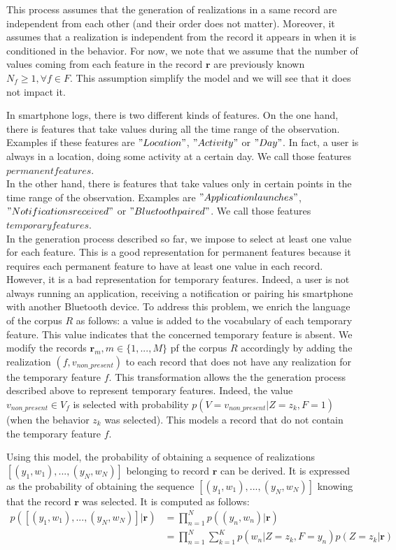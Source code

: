 This process assumes that the generation of realizations in a same record are independent from each other (and their order does not matter). Moreover, it assumes that a realization is independent from the record it appears in when it is conditioned in the behavior. For now, we note that we assume that the number of values coming from each feature in the record $\mathbf{r}$ are previously known $N_{f}\geq 1,\forall f\in F$. This assumption simplify the model and we will see that it does not impact it. \par

In smartphone logs, there is two different kinds of features. On the one hand, there is features that take values during all the time range of the observation. Examples if these features are $"Location"$, $"Activity"$ or $"Day"$. In fact, a user is always in a location, doing some activity at a certain day. We call those features $permanent features$.
\\In the other hand, there is features that take values only in certain points in the time range of the observation. Examples are $"Application launches"$, $"Notifications received"$ or $"Bluetooth paired"$. We call those features $temporary features$.
\\In the generation process described so far, we impose to select at least one value for each feature. This is a good representation for permanent features because it requires each permanent feature to have at least one value in each record. However, it is a bad representation for temporary features. Indeed, a user is not always running an application, receiving a notification or pairing his smartphone with another Bluetooth device. To address this problem, we enrich the language of the corpus $R$ as follows: a value is added to the vocabulary of each temporary feature. This value indicates that the concerned temporary feature is absent. We modify the records $\mathbf{r}_{m}, m\in\{1,...,M\}$ pf the corpus $R$ accordingly by adding the realization $(f, v_{non\_present})$ to each record that does not have any realization for the temporary feature $f$. This transformation allows the the generation process described above to represent temporary features. Indeed, the value $v_{non\_present} \in V_{f}$ is selected with probability $p(V=v_{non\_present}|Z=z_{k},F=1)$ (when the behavior $z_{k}$ was selected). This models a record that do not contain the temporary feature $f$. \par

Using this model, the probability of obtaining a sequence of realizations $[(y_{1},w_{1}),...,(y_{N},w_{N})]$ belonging to record $\mathbf{r}$ can be derived. It is expressed as the probability of obtaining the sequence $[(y_{1},w_{1}),...,(y_{N},w_{N})]$ knowing that the record $\mathbf{r}$ was selected. It is computed as follows:
\begin{equation} \label{eqhcmmdt1}
\begin{aligned}
p([(y_{1},w_{1}),...,(y_{N},w_{N})]|\mathbf{r})&=\prod_{n=1}^{N}p((y_{n},w_{n})|\mathbf{r})\\
&=\prod_{n=1}^{N}\sum_{k=1}^{K}p(w_{n}|Z=z_{k}, F=y_{n})p(Z=z_{k}|\mathbf{r})
\end{aligned}
\end{equation}

